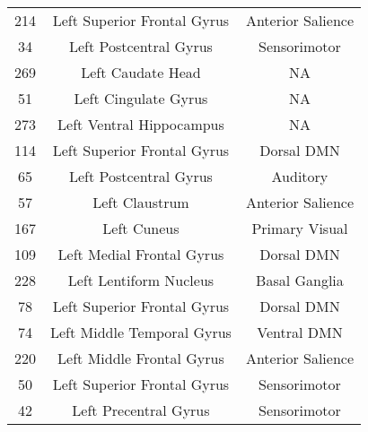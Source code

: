 \documentclass[10pt,letterpaper]{article}\usepackage[]{graphicx}\usepackage[]{color}
\begin{document}
\begin{center}
\begin{longtable}[c]{ccc}
		214	& Left Superior Frontal Gyrus & Anterior Salience \\
		34 & Left Postcentral Gyrus	& Sensorimotor \\
		269	& Left Caudate Head	& NA \\
		51 & Left Cingulate Gyrus & NA \\
		273	& Left Ventral Hippocampus & NA \\
		114 & Left Superior Frontal Gyrus & Dorsal DMN \\
		65 & Left Postcentral Gyrus	& Auditory \\
		57 & Left Claustrum	& Anterior Salience \\
		167	& Left Cuneus & Primary Visual \\
		109	& Left Medial Frontal Gyrus	& Dorsal DMN \\
		228	& Left Lentiform Nucleus & Basal Ganglia \\
		78 & Left Superior Frontal Gyrus & Dorsal DMN \\
		74 & Left Middle Temporal Gyrus	& Ventral DMN \\
		220	& Left Middle Frontal Gyrus	& Anterior Salience \\
		50 & Left Superior Frontal Gyrus & Sensorimotor \\
		42 & Left Precentral Gyrus & Sensorimotor \\
	\end{longtable}
\end{center}
\end{document}
